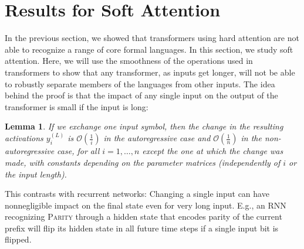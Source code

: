 \documentclass[11pt,a4paper]{article}
\newcounter{theorem}
\newtheorem{lemma}[theorem]{Lemma}
\begin{document}




\section{Results for Soft Attention}\label{sec:soft}



In the previous section, we showed that transformers using hard attention are not able to recognize a range of core formal languages.
In this section, we study soft attention. %
Here, we will use the smoothness of the operations used in transformers to show that any transformer, as inputs get longer, will not be able to robustly separate members of the languages from other inputs.
The idea behind the proof is that the impact of any single input on the output of the transformer is small if the input is long:
\begin{lemma}\label{lemma:diff-1n}
If we exchange one input symbol, %
then the change in the resulting activations $y_i^{(L)}$ is $\mathcal{O}(\frac{1}{i})$ in the autoregressive case and  $\mathcal{O}(\frac{1}{n})$ in the non-autoregressive case, for all $i = 1, \dots, n$ except the one at which the change was made, with constants depending on the parameter matrices (independently of $i$ or the input length).
\end{lemma}
This contrasts with recurrent networks:
Changing a single input can have nonnegligible impact on the final state even for very long input.
E.g., an RNN recognizing \textsc{Parity} through a hidden state that encodes parity of the current prefix will flip its hidden state in all future time steps if a single input bit is flipped.
\end{document}
